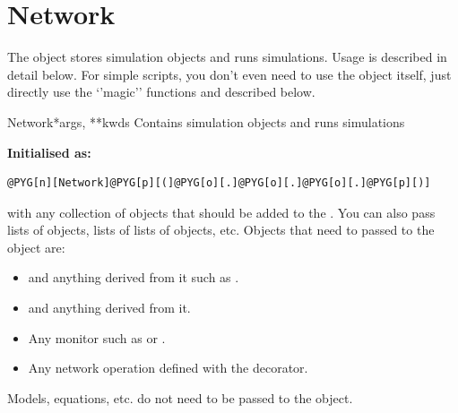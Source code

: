 \documentclass[letterpaper,10pt,english]{manual}
\begin{document}
\resetcurrentobjects
\hypertarget{--doc-reference-network}{}

\section{Network}

The \hyperlink{brian.Network}{} object stores simulation objects and runs simulations. Usage
is described in detail below. For simple scripts, you don't even need to
use the \hyperlink{brian.Network}{} object itself, just directly use the `'magic'' functions
\hyperlink{brian.run}{} and \hyperlink{brian.reinit}{} described below.

\hypertarget{brian.Network}{}\begin{classdesc}{Network}{*args, **kwds}
Contains simulation objects and runs simulations

\textbf{Initialised as:}

\begin{Verbatim}[commandchars=@\[\]]
@PYG[n][Network]@PYG[p][(]@PYG[o][.]@PYG[o][.]@PYG[o][.]@PYG[p][)]
\end{Verbatim}

with  any collection of objects that should be added to the \hyperlink{brian.Network}{}.
You can also pass lists of objects, lists of lists of objects, etc. Objects
that need to passed to the \hyperlink{brian.Network}{} object are:
\begin{itemize}
\item {} 
\hyperlink{brian.NeuronGroup}{} and anything derived from it such as \hyperlink{brian.PoissonGroup}{}.

\item {} 
\hyperlink{brian.Connection}{} and anything derived from it.

\item {} 
Any monitor such as \hyperlink{brian.SpikeMonitor}{} or \hyperlink{brian.StateMonitor}{}.

\item {} 
Any network operation defined with the \hyperlink{brian.network_operation}{} decorator.

\end{itemize}

Models, equations, etc. do not need to be passed to the \hyperlink{brian.Network}{} object.


\end{classdesc}
\end{document}
